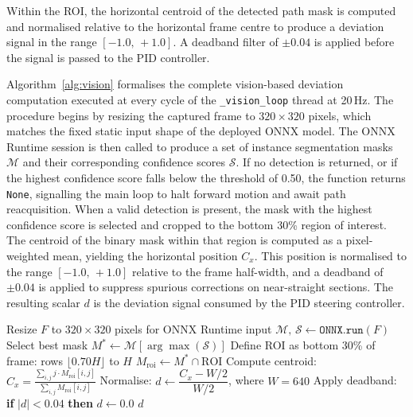 Within the ROI, the horizontal centroid of the detected path mask is
computed and normalised relative to the horizontal frame centre to
produce a deviation signal in the range $[-1.0,\,+1.0]$. A deadband
filter of $\pm 0.04$ is applied before the signal is passed to the
PID controller.

Algorithm~\ref{alg:vision} formalises the complete vision-based deviation computation executed at every cycle of the \texttt{\_vision\_loop} thread at 20\,Hz. The procedure begins by resizing the captured frame to $320\times320$ pixels, which matches the fixed static input shape of the deployed ONNX model. The ONNX Runtime session is then called to produce a set of instance segmentation masks $\mathcal{M}$ and their corresponding confidence scores $\mathcal{S}$. If no detection is returned, or if the highest confidence score falls below the threshold of 0.50, the function returns \texttt{None}, signalling the main loop to halt forward motion and await path reacquisition. When a valid detection is present, the mask with the highest confidence score is selected and cropped to the bottom 30\% region of interest. The centroid of the binary mask within that region is computed as a pixel-weighted mean, yielding the horizontal position $C_x$. This position is normalised to the range $[-1.0,\,+1.0]$ relative to the frame half-width, and a deadband of $\pm 0.04$ is applied to suppress spurious corrections on near-straight sections. The resulting scalar $d$ is the deviation signal consumed by the PID steering controller.

\begin{algorithm}[H]
\DontPrintSemicolon
\caption{Vision-Based Path Deviation Computation}
\label{alg:vision}
\BlankLine
Resize $F$ to $320\times320$ pixels for ONNX Runtime input\;
$\mathcal{M},\,\mathcal{S} \leftarrow \texttt{ONNX.run}(F)$ 
Select best mask $M^{*} \leftarrow \mathcal{M}[\arg\max(\mathcal{S})]$\;
Define ROI as bottom 30\% of frame: rows $\lfloor 0.70H\rfloor$ to $H$\;
$M_{\text{roi}} \leftarrow M^{*}\cap\text{ROI}$\;
Compute centroid: $\displaystyle C_x = \frac{\sum_{i,j} j\cdot M_{\text{roi}}[i,j]}{\sum_{i,j} M_{\text{roi}}[i,j]}$\;
Normalise: $d \leftarrow \dfrac{C_x - W/2}{W/2}$, where $W=640$\;
Apply deadband: \textbf{if} $|d|<0.04$ \textbf{then} $d\leftarrow 0.0$\;
\Return $d$\;
\end{algorithm}

